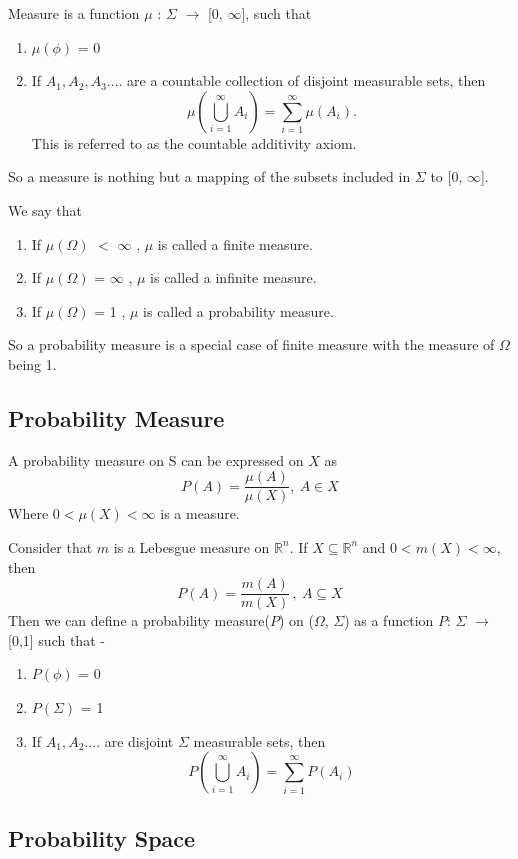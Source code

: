 \documentclass{article}
\begin{document}
Measure is a function $\mu$ : $\Sigma$ $\rightarrow$ [0, $\infty$], such that
\begin{enumerate}
    \item $\mu(\phi)$ = 0
    \item If $A_{1}, A_{2} ,A_{3} ....$ are a countable collection of disjoint measurable sets, then  $$\mu(\bigcup_{i=1}^{\infty} {A_i}) = \sum_{i=1}^{\infty}\mu(A_i).$$ This is referred to as the countable additivity axiom.
\end{enumerate}
So a measure is nothing but a mapping of the subsets included in $\Sigma$ to [0, $\infty$].
\bigskip

We say that
\begin{enumerate}
    \item If $\mu(\Omega)$ $<$ $\infty$ , $\mu$ is called a finite measure.
    \item If $\mu(\Omega)$ = $\infty$ , $\mu$ is called a infinite measure.
    \item If $\mu(\Omega)$ =  1 , $\mu$ is called a probability measure.
\end{enumerate}

So a probability measure is a special case of finite measure with the measure of $\Omega$ being 1.
\bigskip

\subsection{Probability Measure}

A probability measure on S can be expressed on $X$ as
$$P(A) = \frac{\mu(A)}{\mu(X)}, \ A \in X$$
Where $0 < \mu(X) < \infty$ is a measure.\medskip

Consider that $m$ is a Lebesgue measure on $\mathbb{R}^n$. If $X \subseteq  \mathbb{R}^n$ and $0 < m(X) < \infty$, then
$$P(A) = \frac{m(A)}{m(X)}\,, \ A \subseteq X$$
Then we can define a probability measure($P$) on ($\Omega$, $\Sigma$) as a function $P$: $\Sigma$ $\rightarrow$ [0,1] such that -
\begin{enumerate}
    \item $P(\phi)$ = 0
    \item $P(\Sigma)$ = 1
    \item If $A_{1}, A_{2} .... $ are disjoint $\Sigma$ measurable sets, then
    $$P(\bigcup_{i=1}^{\infty} {A_i}) = \sum_{i=1}^{\infty}P(A_i)$$
\end{enumerate}

\subsection{Probability Space}
\end{document}
